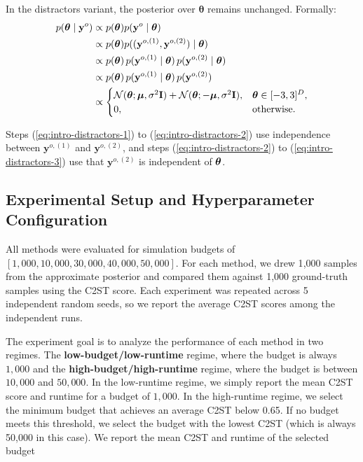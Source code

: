 In the distractors variant, the posterior over $\boldsymbol{\theta}$ remains unchanged.  
Formally:
\begin{align}
  p(\boldsymbol{\theta} \mid \mathbf{y}^o)
  &\propto p(\boldsymbol{\theta}) p(\mathbf{y}^o \mid \boldsymbol{\theta}) \\
  &\propto p(\boldsymbol{\theta}) p((\mathbf{y}^{o,(1)}, \mathbf{y}^{o,(2)}) \mid \boldsymbol{\theta}) \label{eq:intro-distractors-1} \\
  &\propto p(\boldsymbol{\theta}) \, p(\mathbf{y}^{o,(1)} \mid \boldsymbol{\theta}) \, p(\mathbf{y}^{o,(2)} \mid \boldsymbol{\theta}) \label{eq:intro-distractors-2} \\
  &\propto p(\boldsymbol{\theta}) \, p(\mathbf{y}^{o,(1)} \mid \boldsymbol{\theta}) \, p(\mathbf{y}^{o,(2)}) \label{eq:intro-distractors-3} \\
  &\propto
    \begin{cases}
      \mathcal{N}(\boldsymbol{\theta}; \boldsymbol{\mu}, \sigma^2\mathbf{I}) + \mathcal{N}(\boldsymbol{\theta}; -\boldsymbol{\mu}, \sigma^2\mathbf{I}), & \boldsymbol{\theta} \in [-3, 3]^D, \\
      0, & \text{otherwise}.
    \end{cases}
  \label{eq:intro-distractors}
\end{align}

Steps (\ref{eq:intro-distractors-1}) to (\ref{eq:intro-distractors-2}) use independence between $\mathbf{y}^{o,(1)}$ and $\mathbf{y}^{o,(2)}$, and steps (\ref{eq:intro-distractors-2}) to (\ref{eq:intro-distractors-3}) use that $\mathbf{y}^{o,(2)}$ is independent of $\boldsymbol{\theta}$.

\subsection{Experimental Setup and Hyperparameter Configuration}

All methods were evaluated for simulation budgets of
$
[1{,}000, 10{,}000, 30{,}000, 40{,}000, 50{,}000]
$.
For each method, we drew 1{,}000 samples from the approximate posterior and compared them against 1{,}000 ground-truth samples using the C2ST score.  
Each experiment was repeated across 5 independent random seeds, so we report the average C2ST scores among the independent runs.

The experiment goal is to analyze the performance of each method in two regimes.
The \textbf{low-budget/low-runtime} regime, where the budget is always $1{,}000$ and the
\textbf{high-budget/high-runtime} regime, where the budget is between $10{,}000$ and $50{,}000$.
In the low-runtime regime, we simply report the mean C2ST score and runtime for a budget of $1{,}000$.  
In the high-runtime regime, we select the minimum budget that achieves an average C2ST below 0.65. If no budget meets this threshold, we select the budget with the lowest C2ST (which is always 50{,}000 in this case).
We report the mean C2ST and runtime of the selected budget

